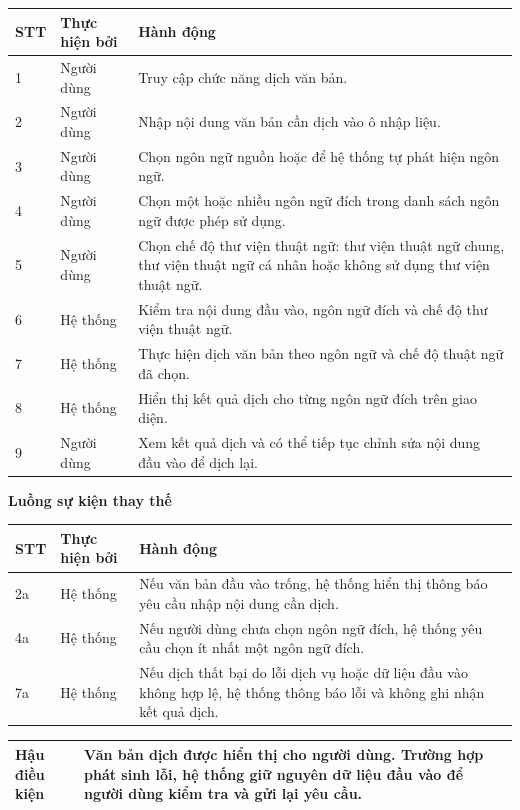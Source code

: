\documentclass[../DoAn.tex]{subfiles}
\begin{document}
\begin{longtable}{|p{1cm}|p{3.3cm}|p{10.2cm}|}
\hline
\textbf{STT} & \textbf{Thực hiện bởi} & \textbf{Hành động} \\ \hline
1 & Người dùng & Truy cập chức năng dịch văn bản. \\ \hline
2 & Người dùng & Nhập nội dung văn bản cần dịch vào ô nhập liệu. \\ \hline
3 & Người dùng & Chọn ngôn ngữ nguồn hoặc để hệ thống tự phát hiện ngôn ngữ. \\ \hline
4 & Người dùng & Chọn một hoặc nhiều ngôn ngữ đích trong danh sách ngôn ngữ được phép sử dụng. \\ \hline
5 & Người dùng & Chọn chế độ thư viện thuật ngữ: thư viện thuật ngữ chung, thư viện thuật ngữ cá nhân hoặc không sử dụng thư viện thuật ngữ. \\ \hline
6 & Hệ thống & Kiểm tra nội dung đầu vào, ngôn ngữ đích và chế độ thư viện thuật ngữ. \\ \hline
7 & Hệ thống & Thực hiện dịch văn bản theo ngôn ngữ và chế độ thuật ngữ đã chọn. \\ \hline
8 & Hệ thống & Hiển thị kết quả dịch cho từng ngôn ngữ đích trên giao diện. \\ \hline
9 & Người dùng & Xem kết quả dịch và có thể tiếp tục chỉnh sửa nội dung đầu vào để dịch lại. \\ \hline
\end{longtable}

\textbf{Luồng sự kiện thay thế}

\begin{longtable}{|p{1cm}|p{3.3cm}|p{10.2cm}|}
\hline
\textbf{STT} & \textbf{Thực hiện bởi} & \textbf{Hành động} \\ \hline
2a & Hệ thống & Nếu văn bản đầu vào trống, hệ thống hiển thị thông báo yêu cầu nhập nội dung cần dịch. \\ \hline
4a & Hệ thống & Nếu người dùng chưa chọn ngôn ngữ đích, hệ thống yêu cầu chọn ít nhất một ngôn ngữ đích. \\ \hline
7a & Hệ thống & Nếu dịch thất bại do lỗi dịch vụ hoặc dữ liệu đầu vào không hợp lệ, hệ thống thông báo lỗi và không ghi nhận kết quả dịch. \\ \hline
\end{longtable}

\begin{longtable}{|p{4cm}|p{10.5cm}|}
\hline
\textbf{Hậu điều kiện} & Văn bản dịch được hiển thị cho người dùng. Trường hợp phát sinh lỗi, hệ thống giữ nguyên dữ liệu đầu vào để người dùng kiểm tra và gửi lại yêu cầu. \\ \hline
\end{longtable}
\end{document}
